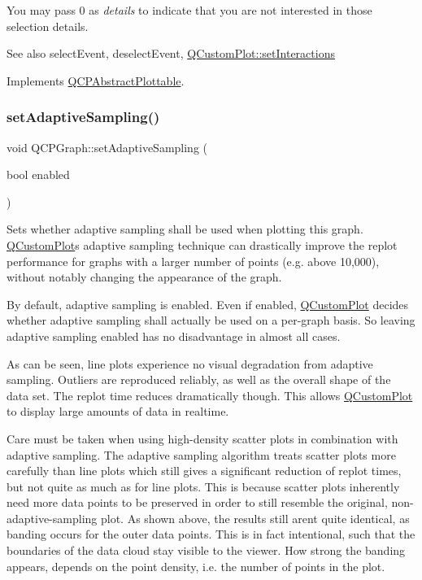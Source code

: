 You may pass 0 as {\itshape details} to indicate that you are not interested in those selection details.

\begin{DoxySeeAlso}{See also}
select\+Event, deselect\+Event, \hyperlink{class_q_custom_plot_a5ee1e2f6ae27419deca53e75907c27e5}{Q\+Custom\+Plot\+::set\+Interactions} 
\end{DoxySeeAlso}


Implements \hyperlink{class_q_c_p_abstract_plottable_a38efe9641d972992a3d44204bc80ec1d}{Q\+C\+P\+Abstract\+Plottable}.

\hypertarget{class_q_c_p_graph_ab468cd600160f327836aa0644291e64c}{}\label{class_q_c_p_graph_ab468cd600160f327836aa0644291e64c} 
\subsubsection{\texorpdfstring{set\+Adaptive\+Sampling()}{setAdaptiveSampling()}}
{\footnotesize\ttfamily void Q\+C\+P\+Graph\+::set\+Adaptive\+Sampling (\begin{DoxyParamCaption}\item[{bool}]{enabled }\end{DoxyParamCaption})}

Sets whether adaptive sampling shall be used when plotting this graph. \hyperlink{class_q_custom_plot}{Q\+Custom\+Plot}\textquotesingle{}s adaptive sampling technique can drastically improve the replot performance for graphs with a larger number of points (e.\+g. above 10,000), without notably changing the appearance of the graph.

By default, adaptive sampling is enabled. Even if enabled, \hyperlink{class_q_custom_plot}{Q\+Custom\+Plot} decides whether adaptive sampling shall actually be used on a per-\/graph basis. So leaving adaptive sampling enabled has no disadvantage in almost all cases.

 As can be seen, line plots experience no visual degradation from adaptive sampling. Outliers are reproduced reliably, as well as the overall shape of the data set. The replot time reduces dramatically though. This allows \hyperlink{class_q_custom_plot}{Q\+Custom\+Plot} to display large amounts of data in realtime.

 Care must be taken when using high-\/density scatter plots in combination with adaptive sampling. The adaptive sampling algorithm treats scatter plots more carefully than line plots which still gives a significant reduction of replot times, but not quite as much as for line plots. This is because scatter plots inherently need more data points to be preserved in order to still resemble the original, non-\/adaptive-\/sampling plot. As shown above, the results still aren\textquotesingle{}t quite identical, as banding occurs for the outer data points. This is in fact intentional, such that the boundaries of the data cloud stay visible to the viewer. How strong the banding appears, depends on the point density, i.\+e. the number of points in the plot.


